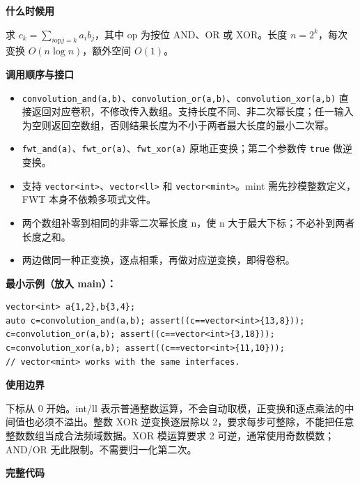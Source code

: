 \documentclass[UTF8,a4paper,10pt]{ctexart}
\newcommand{\TemplUsage}[1]{\textbf{什么时候用}\par #1\par}
\newcommand{\TemplApi}[1]{\textbf{调用顺序与接口}\par #1\par}
\newcommand{\TemplNote}[1]{\textbf{使用边界}\par #1\par}
\begin{document}
\TemplUsage{求 $c_k=\sum_{i\mathbin{\mathrm{op}}j=k}a_i b_j$，其中 op 为按位 AND、OR 或 XOR。长度 $n=2^k$，每次变换 $O(n\log n)$，额外空间 $O(1)$。}
\TemplApi{\begin{itemize}
\item \texttt{convolution\_and(a,b)}、\texttt{convolution\_or(a,b)}、\texttt{convolution\_xor(a,b)} 直接返回对应卷积，不修改传入数组。支持长度不同、非二次幂长度；任一输入为空则返回空数组，否则结果长度为不小于两者最大长度的最小二次幂。
\item \texttt{fwt\_and(a)}、\texttt{fwt\_or(a)}、\texttt{fwt\_xor(a)} 原地正变换；第二个参数传 \texttt{true} 做逆变换。
\item 支持 \texttt{vector<int>}、\texttt{vector<ll>} 和 \texttt{vector<mint>}。mint 需先抄模整数定义，FWT 本身不依赖多项式文件。
\item 两个数组补零到相同的非零二次幂长度 n，使 n 大于最大下标；不必补到两者长度之和。
\item 两边做同一种正变换，逐点相乘，再做对应逆变换，即得卷积。
\end{itemize}}
\textbf{最小示例（放入 main）：}
\begin{lstlisting}
vector<int> a{1,2},b{3,4};
auto c=convolution_and(a,b); assert((c==vector<int>{13,8}));
c=convolution_or(a,b); assert((c==vector<int>{3,18}));
c=convolution_xor(a,b); assert((c==vector<int>{11,10}));
// vector<mint> works with the same interfaces.
\end{lstlisting}
\TemplNote{下标从 0 开始。int/ll 表示普通整数运算，不会自动取模，正变换和逐点乘法的中间值也必须不溢出。整数 XOR 逆变换逐层除以 2，要求每步可整除，不能把任意整数数组当成合法频域数据。XOR 模运算要求 2 可逆，通常使用奇数模数；AND/OR 无此限制。不需要归一化第二次。}
\textbf{完整代码}
\end{document}
